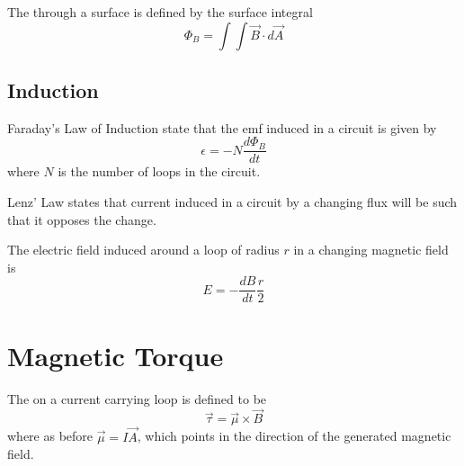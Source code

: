 \documentclass[12pt]{report}
\begin{document}
\begin{defn}{}{}
        The  through a surface is defined by the surface integral \begin{equation}
                \Phi_B = \int\int \vec{B}\cdot d\vec{A}
        \end{equation}
\end{defn}

\subsection{Induction}

\begin{thm}{Faraday's Law of Induction}{}
         state that the emf induced in a circuit is given by \begin{equation}
                \epsilon = -N\frac{d\Phi_B}{dt}
        \end{equation}
        where $N$ is the number of loops in the circuit.
\end{thm}


\begin{thm}{Lenz' Law}{}
         states that current induced in a circuit by a changing flux will be such that it opposes the change.
\end{thm}


\begin{thm}{}{}
        The electric field induced around a loop of radius $r$ in a changing magnetic field is \begin{equation}
                E = -\frac{dB}{dt}\frac{r}{2}
        \end{equation}
\end{thm}

\section{Magnetic Torque}

\begin{defn}{}{}
        The  on a current carrying loop is defined to be \begin{equation}
                \vec{\tau} = \vec{\mu}\times \vec{B}
        \end{equation}
        where as before $\vec{\mu} = I\vec{A}$, which points in the direction of the generated magnetic field.
\end{defn}
\end{document}
